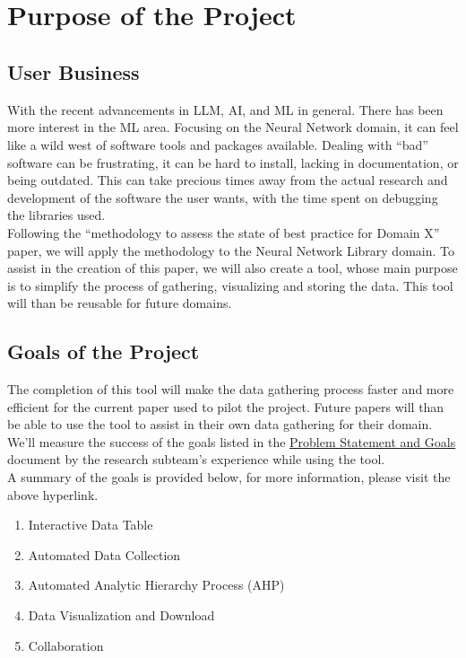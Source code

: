 \documentclass[12pt]{article}
\begin{document}
~\newpage

\tableofcontents

~\newpage
\section{Purpose of the Project}
\subsection{User Business}
With the recent advancements in LLM, AI, and ML in general. There has been more interest in the ML area. Focusing on the Neural Network domain, it can feel like a wild west of software tools and packages available. Dealing with “bad” software can be frustrating, it can be hard to install, lacking in documentation, or being outdated. 
This can take precious times away from the actual research and development of the software the user wants, with the time spent on debugging the libraries used.
\\Following the “methodology to assess the state of best practice for Domain X” paper, we will apply the methodology to the Neural Network Library domain. 
To assist in the creation of this paper, we will also create a tool, whose main purpose is to simplify the process of gathering, visualizing and storing the data. This tool will than be reusable for future domains. 
\subsection{Goals of the Project}
The completion of this tool will make the data gathering process faster and more efficient for the current paper used to pilot the project. Future papers will than be able to use the tool to assist in their own data gathering for their domain.\\
We'll measure the success of the goals listed in the \href{https://github.com/thaafei/DomainX/blob/main/docs/ProblemStatementAndGoals/ProblemStatement.pdf}{Problem Statement and Goals} document by the research subteam's experience while using the tool. \\
A summary of the goals is provided below, for more information, please visit the above hyperlink.
\begin{enumerate}
  \item Interactive Data Table
  \item Automated Data Collection
  \item Automated Analytic Hierarchy Process (AHP)
  \item Data Visualization and Download
  \item Collaboration
\end{enumerate}
\end{document}
